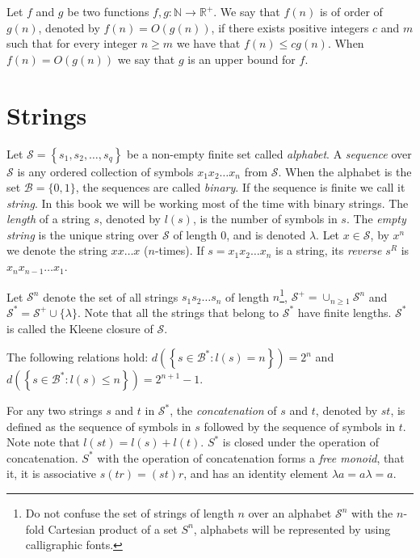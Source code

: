 Let $f$ and $g$ be two functions $f,g:\mathbb{N}\rightarrow\mathbb{R}^{+}$. We say that $f(n)$ is of order of $g(n)$, denoted by $f(n)=O(g(n))$, if there exists positive integers $c$ and $m$ such that for every integer $n \geq m$ we have that $f(n)\leq cg(n)$. When $f(n)=O(g(n))$ we say that $g$ is an upper bound for $f$.

%
%

\section{Strings}
\label{sec:strings}

Let $\mathcal{S}=\left\{ s_{1},s_{2},\ldots,s_{q}\right\}$ be a non-empty finite set called \emph{alphabet}. A \emph{sequence} over $\mathcal{S}$ is any ordered collection of symbols $x_1 x_2 \dots x_n$ from $\mathcal{S}$. When the alphabet is the set $\mathcal{B} = \{0, 1\}$, the sequences are called \emph{binary}. If the sequence is finite we call it \emph{string}. In this book we will be working most of the time with binary strings. The \emph{length} of a string $s$, denoted by $l(s)$, is the number of symbols in $s$. The \emph{empty string} is the unique string over $\mathcal{S}$ of length 0, and is denoted $\lambda$. Let $x \in \mathcal{S}$, by $x^n$ we denote the string $x x \ldots x$ ($n$-times). If $s = x_1 x_2 \dots x_n$ is a string, its \emph{reverse} $s^R$ is $x_n x_{n-1} \dots x_1$.

Let $\mathcal{S}^{n}$ denote the set of all strings $s_{1}s_{2}\ldots s_{n}$ of length $n$\footnote{Do not confuse the set of strings of length $n$ over an alphabet $\mathcal{S}^n$ with the $n$-fold Cartesian product of a set $S^n$, alphabets will be represented by using calligraphic fonts.}, $\mathcal{S}^{+}=\cup_{n\geq1}\mathcal{S}^{n}$ and $\mathcal{S}^{\ast} = \mathcal{S}^{+} \cup \{\lambda\}$. Note that all the strings that belong to $\mathcal{S}^{\ast}$ have finite lengths. $\mathcal{S}^{\ast}$ is called the Kleene closure of $\mathcal{S}$.

\begin{example}
The following relations hold: $d \left( \left\{ s \in \mathcal{B}^{\ast} : l(s) = n \right\} \right) = 2^n$ and $d \left( \left\{ s \in \mathcal{B}^{\ast} : l(s) \leq n \right\} \right) = 2^{n+1}-1$.
\end{example}

For any two strings $s$ and $t$ in $\mathcal{S}^{\ast}$, the \emph{concatenation} of $s$ and $t$, denoted by $st$, is defined as the sequence of symbols in $s$ followed by the sequence of symbols in $t$. Note note that $l(st) = l(s) + l(t)$. $S^\ast$ is closed under the operation of concatenation. $S^\ast$ with the operation of concatenation forms a \emph{free monoid}, that it, it is associative  $s(tr)=(st)r$, and has an identity element $\lambda a = a \lambda = a$.

